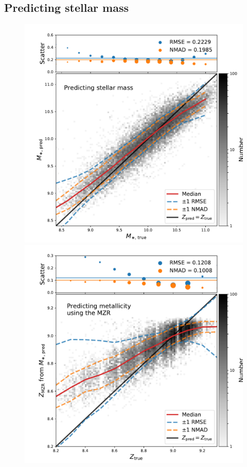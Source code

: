 \documentclass[fleqn,usenatbib]{mnras}
\begin{document}


\subsection{Predicting stellar mass}

\begin{figure}
	\includegraphics[width=\columnwidth]{05-a-prediction_mass.pdf}
	\includegraphics[width=\columnwidth]{05-b-prediction_mzr.pdf}

\end{figure}
\end{document}
